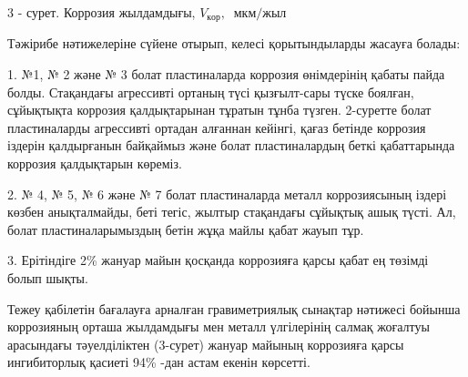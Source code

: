 
3 - сурет. Коррозия жылдамдығы, \(V_{кор},\ \) \(мкм/жыл\)

Тәжірибе нәтижелеріне сүйене отырып, келесі қорытындыларды жасауға
болады:

1. №1, № 2 және № 3 болат пластиналарда коррозия өнімдерінің қабаты
пайда болды. Стақандағы агрессивті ортаның түсі қызғылт-сары түске
боялған, сұйықтықта коррозия қалдықтарынан тұратын тұнба түзген.
2-суретте болат пластиналарды агрессивті ортадан алғаннан кейінгі, қағаз
бетінде коррозия іздерін қалдырғанын байқаймыз және болат пластиналардың
беткі қабаттарында коррозия қалдықтарын көреміз.

2. № 4, № 5, № 6 және № 7 болат пластиналарда металл коррозиясының
іздері көзбен анықталмайды, беті тегіс, жылтыр стақандағы сұйықтық ашық
түсті. Ал, болат пластиналарымыздың бетін жұқа майлы қабат жауып тұр.

3. Ерітіндіге 2\% жануар майын қосқанда коррозияға қарсы қабат ең
төзімді болып шықты.

Тежеу қабілетін бағалауға арналған гравиметриялық сынақтар нәтижесі
бойынша коррозияның орташа жылдамдығы мен металл үлгілерінің салмақ
жоғалтуы арасындағы тәуелділіктен (3-сурет) жануар майының коррозияға
қарсы ингибиторлық қасиеті 94\% -дан астам екенін көрсетті.


